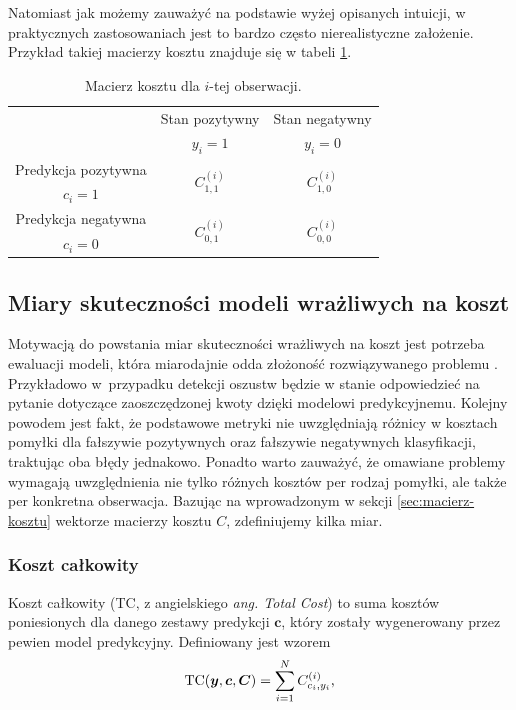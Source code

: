 \documentclass[inzynierska]{pwr_wmat_praca_dyplomowa}
\theoremstyle{plain}
\numberwithin{theorem}{chapter}
\theoremstyle{definition}
\numberwithin{theorem}{chapter}
\begin{document}
Natomiast jak możemy zauważyć na podstawie wyżej opisanych intuicji, w praktycznych zastosowaniach jest to bardzo często nierealistyczne założenie.
Przykład takiej macierzy kosztu znajduje się w tabeli \ref{tab:macierz-kosztu}.
\begin{table}[h]
	\begin{center}
		\begin{tabular}{c|c|c}
			\multirow{2}{4em}{} & Stan pozytywny & Stan negatywny \\
			& $y_i = 1$            & $y_i = 0$ \\
			\hline
			Predykcja pozytywna & \multirow{2}{4em}{\centering $C^{(i)}_{1,1}$} & \multirow{2}{4em}{\centering $C^{(i)}_{1,0}$} \\
			$c_i = 1$         &                    &                    \\
			\hline
			Predykcja negatywna & \multirow{2}{4em}{\centering $C^{(i)}_{0,1}$} & \multirow{2}{4em}{\centering $C^{(i)}_{0,0}$} \\
			$c_i = 0$         &                    &                    \\
		\end{tabular}
	\end{center}
	\caption{Macierz kosztu dla $i$-tej obserwacji.}
	\label{tab:macierz-kosztu}
\end{table}

\subsection{Miary skuteczności modeli wrażliwych na koszt}
Motywacją do powstania miar skuteczności wrażliwych na koszt jest potrzeba ewaluacji modeli, która miarodajnie odda złożoność rozwiązywanego problemu \cite{EDCSLR}. Przykładowo w~przypadku detekcji oszustw będzie w stanie odpowiedzieć na pytanie dotyczące zaoszczędzonej kwoty dzięki modelowi predykcyjnemu. Kolejny powodem jest fakt, że podstawowe metryki nie uwzględniają różnicy w kosztach pomyłki dla fałszywie pozytywnych oraz fałszywie negatywnych klasyfikacji, traktując oba błędy jednakowo. Ponadto warto zauważyć, że omawiane problemy wymagają uwzględnienia nie tylko różnych kosztów per rodzaj pomyłki, ale także per konkretna obserwacja. Bazując na wprowadzonym w sekcji \ref{sec:macierz-kosztu} wektorze macierzy kosztu $C$, zdefiniujemy kilka miar.

\subsubsection{Koszt całkowity}
Koszt całkowity (TC, z angielskiego \textit{ang. Total Cost}) to suma kosztów poniesionych dla danego zestawy predykcji $\boldsymbol{c}$, który zostały wygenerowany przez pewien model predykcyjny. Definiowany jest wzorem
\begin{equation}
	\label{koszt-calkowity}
	\text{TC}(\boldsymbol{y}, \boldsymbol{c}, \boldsymbol{C}) = \sum_{i=1}^N C^{(i)}_{c_i,y_i} \text{,}
\end{equation} 
\end{document}
